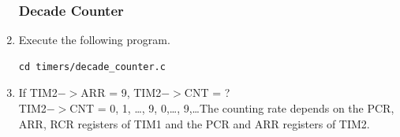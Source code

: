 \documentclass[journal,12pt,twocolumn]{IEEEtran}
\renewcommand\thesection{\arabic{section}}
\renewcommand\thesubsection{\thesection.\arabic{subsection}}
\begin{document}
\begin{enumerate}[label=\thesubsection.\arabic*.,ref=\thesubsection.\theenumi]
\subsubsection{Decade Counter}
\item Execute the following program.
\begin{lstlisting}
cd timers/decade_counter.c
\end{lstlisting}
%
\item If TIM2$->$ARR = 9, TIM2$->$CNT = ?
\\
\solution TIM2$->$CNT = 0, 1, \dots, 9, 0,\dots, 9,\dots The counting rate depends on the PCR, ARR, RCR registers of TIM1 and the PCR
and ARR registers of TIM2.
\end{enumerate}
%
%
%
%
%
\end{document}
